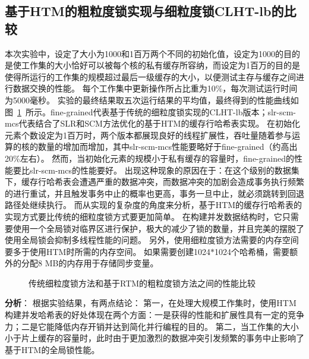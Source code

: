 \subsection{基于HTM的粗粒度锁实现与细粒度锁CLHT-lb的比较}
本次实验中，设定了大小为1000和1百万两个不同的初始化值，设定为1000的目的是使工作集的大小恰好可以被每个核的私有缓存所容纳，而设定为1百万的目的是使得所运行的工作集的规模超过最后一级缓存的大小，以便测试主存与缓存之间进行数据交换的性能。
每个工作集中更新操作所占比重为10\%，每次测试运行时间为5000毫秒。
实验的最终结果取五次运行结果的平均值，最终得到的性能曲线如图~\ref{fig:htm_coarse_grained}~所示。fine-grained代表基于传统的细粒度锁实现的CLHT-lb版本；slr-scm-mcs代表结合了SLR和SCM方法优化的基于HTM的缓存行哈希表实现。
在初始化元素个数设定为1百万时，两个版本都展现良好的线程扩展性，吞吐量随着参与运算的核的数量的增加而增加，其中slr-scm-mcs性能要略好于fine-grained（约高出20\%左右）。
然而，当初始化元素的规模小于私有缓存的容量时，fine-grained的性能要比slr-scm-mcs的性能要好。
出现这种现象的原因在于：在这个级别的数据集下，缓存行哈希表会遭遇严重的数据冲突，而数据冲突的加剧会造成事务执行频繁的进行重试，并且触发事务中止的概率也更高，事务一旦中止，就必须跳转到回退路径处继续执行。
而从实现的复杂度的角度来分析，基于HTM的缓存行哈希表的实现方式要比传统的细粒度锁方式要更加简单。
在构建并发数据结构时，它只需要使用一个全局锁对临界区进行保护，极大的减少了锁的数量，并且完美的摆脱了使用全局锁会抑制多线程性能的问题。
另外，使用细粒度锁方法需要的内存空间要多于使用HTM时所需的内存空间。
如果需要创建1024$*$1024个哈希桶，需要额外的分配8 MB的内存用于存储同步变量。

\begin{figure}[htbp]
\centering
\caption{传统细粒度锁方法和基于RTM的粗粒度锁方法之间的性能比较}
\label{fig:htm_coarse_grained}
\end{figure}

\textbf{分析}： 根据实验结果，有两点结论：
第一，在处理大规模工作集时，使用HTM构建并发哈希表的好处体现在两个方面：一是获得的性能和扩展性具有一定的竞争力；二是它能降低内存开销并达到简化并行编程的目的。
第二，当工作集的大小小于片上缓存的容量时，此时由于更加激烈的数据冲突引发频繁的事务中止影响了基于HTM的全局锁性能。

